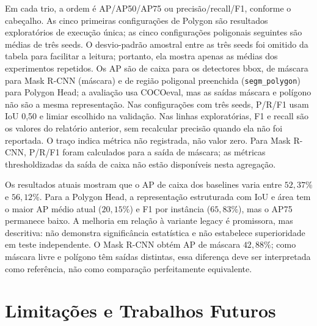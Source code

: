 \documentclass[11pt]{article}
\begin{document}
\normalsize
{\footnotesize
Em cada trio, a ordem é AP/AP50/AP75 ou precisão/recall/F1, conforme o cabeçalho.
As cinco primeiras configurações de Polygon são resultados exploratórios de
execução única; as cinco configurações poligonais seguintes são médias de três
seeds. O desvio-padrão amostral entre as três seeds foi omitido da tabela para
facilitar a leitura; portanto, ela mostra apenas as médias dos experimentos
repetidos. Os AP são de caixa para os detectores bbox, de máscara para Mask R-CNN
(máscara) e de região poligonal preenchida (\texttt{segm\_polygon}) para Polygon
Head; a avaliação usa COCOeval, mas as saídas máscara e polígono não são a mesma
representação. Nas configurações com três seeds, P/R/F1 usam IoU 0,50 e limiar
escolhido na validação. Nas linhas exploratórias, F1 e recall são os valores do
relatório anterior, sem recalcular precisão quando ela não foi reportada. O traço
indica métrica não registrada, não valor zero. Para Mask R-CNN, P/R/F1 foram
calculados para a saída de máscara; as métricas thresholdizadas da saída de caixa
não estão disponíveis nesta agregação.\par}

Os resultados atuais mostram que o AP de caixa dos baselines varia entre
$52,37\%$ e $56,12\%$. Para a Polygon Head, a representação estruturada com IoU e
área tem o maior AP médio atual ($20,15\%$) e F1 por instância ($65,83\%$), mas o
AP75 permanece baixo. A melhoria em relação à variante legacy é promissora, mas
descritiva: não demonstra significância estatística e não estabelece superioridade
em teste independente. O Mask R-CNN obtém AP de máscara $42,88\%$; como máscara
livre e polígono têm saídas distintas, essa diferença deve ser interpretada como
referência, não como comparação perfeitamente equivalente.

\section{Limitações e Trabalhos Futuros}
\label{sec:limitacoes}
\end{document}

